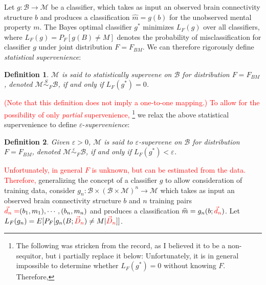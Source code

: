 \documentclass{article}
\newcommand{\mB}{\mathcal{B}}
\newcommand{\mM}{\mathcal{M}}
\newcommand{\MeB}{\mM \overset{\varepsilon}{{\sim}}_F \mB}
\providecommand{\tr}[1]{\textcolor{red}{#1}}
\newtheorem{defi}{Definition}
\begin{document}
Let $g:\mB \rightarrow \mM$ be a classifier, which takes as input an observed brain connectivity structure $b$ and produces a classification $\widehat{m}=g(b)$ for the unobserved mental property $m$. The Bayes optimal classifier $g^*$ minimizes $L_{F}(g)$ over all classifiers, where $L_{F}(g) = P_{F}[g(B) \neq M]$ denotes the probability of misclassification for classifier $g$ under joint distribution $F=F_{BM}$. We can therefore rigorously define \textit{statistical supervenience}:

\begin{defi}
\label{def1} 
$\mM$ is said to \textit{statistically supervene} on $\mB$ for distribution $F=F_{BM}$, denoted $\mM \overset{S}{\sim}_F \mB$, if and only if $L_{F}(g^*) = 0$.
\end{defi}

\tr{(Note that this definition does not imply a one-to-one mapping.)}  \tr{To allow for the possibility of only \emph{partial} supervenience,} \footnote{The following was stricken from the record, as I believed it to be a non-sequitor, but i partially replace it below: Unfortunately, it is in general impossible to determine whether $L_F(g^*)=0$ without knowing $F$. Therefore,} we relax the above statistical supervenience to define $\varepsilon$-\textit{supervenience}:

\begin{defi}
\label{def2}
Given $\varepsilon > 0$, $\mM$ is said to $\varepsilon$-\textit{supervene} on $\mB$ for distribution $F=F_{BM}$, denoted $\MeB$, if and only if $L_{F}(g^*) < \varepsilon$.
\end{defi}

\tr{Unfortunately, in general $F$ is unknown, but can be estimated from the data. Therefore,} generalizing the concept of a classifier $g$ to allow consideration of training data, consider $g_n:\mB \times (\mB \times \mM)^n \rightarrow \mM$ which takes as input an observed brain connectivity structure $b$ and $n$ training pairs $\tr{\vec{d}_n=}(b_1,m_1),\cdots,(b_n,m_n)$ and produces a classification $\widehat{m}=g_n(b;\tr{\vec{d}_n})$. Let $L_{F}(g_n) = E[P_{F}[g_n(B;\tr{\vec{D}_n}) \neq M|\tr{\vec{D}_n}]]$.
\end{document}
